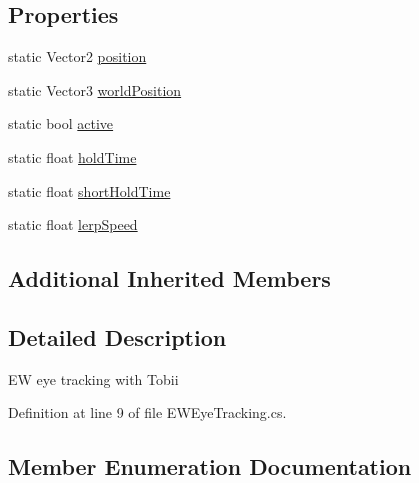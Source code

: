 \subsection*{Properties}
\begin{DoxyCompactItemize}
\item 
static Vector2 \mbox{\hyperlink{class_e_w_eye_tracking_a4733f318537a97a2fe9fad575453ad37}{position}}
\item 
static Vector3 \mbox{\hyperlink{class_e_w_eye_tracking_ada8347aa7a674825995b36f3df32930f}{world\+Position}}
\item 
static bool \mbox{\hyperlink{class_e_w_eye_tracking_a1c2b663231ab1603020b7a76cba1816b}{active}}
\item 
static float \mbox{\hyperlink{class_e_w_eye_tracking_a3c926417716c9568a436d368667f7f73}{hold\+Time}}
\item 
static float \mbox{\hyperlink{class_e_w_eye_tracking_ac1f3d7023d4ce02779c2012c53c8a834}{short\+Hold\+Time}}
\item 
static float \mbox{\hyperlink{class_e_w_eye_tracking_a7d28d1462a5ea4bf3d560ee5f7e8804e}{lerp\+Speed}}
\end{DoxyCompactItemize}
\subsection*{Additional Inherited Members}


\subsection{Detailed Description}
EW eye tracking with Tobii 



Definition at line 9 of file E\+W\+Eye\+Tracking.\+cs.



\subsection{Member Enumeration Documentation}
\mbox{\label{class_e_w_eye_tracking_a47461bd1b91c6aacca31b57253249392}} 
